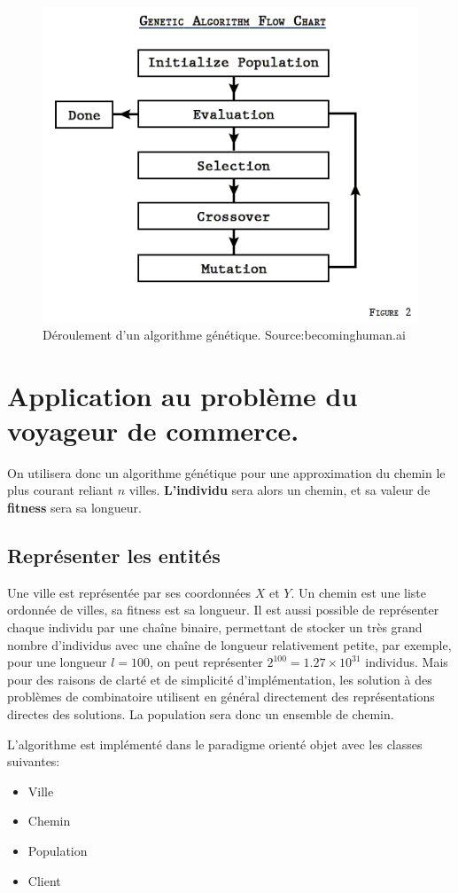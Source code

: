 \documentclass[11pt]{article}
\begin{document}
\begin{figure}[H]
\centering
\includegraphics[width=.6\linewidth]{./GA.png}
\caption{Déroulement d'un algorithme génétique. Source:becominghuman.ai}
\end{figure}

\section{Application au problème du voyageur de commerce.}
\label{sec-2}

On utilisera donc un algorithme génétique pour une approximation du chemin le plus courant reliant $n$ villes.
\textbf{L'individu} sera alors un chemin, et sa valeur de \textbf{fitness} sera sa longueur.   

\subsection{Représenter les entités}
\label{sec-2-1}

Une ville est représentée par ses coordonnées $X$ et $Y$.
Un chemin est une liste ordonnée de villes, sa fitness est sa longueur. Il est aussi possible de représenter chaque individu par une chaîne
binaire, permettant de stocker un très grand nombre d'individus avec une chaîne de longueur relativement petite, par exemple, pour une longueur
$l = 100$, on peut représenter $2^{100} = 1.27 \times 10^{31}$ individus. Mais pour des raisons de clarté et de simplicité d'implémentation,
les solution à des problèmes de combinatoire utilisent en général directement des représentations directes des solutions.
La population sera donc un ensemble de chemin.

L'algorithme est implémenté dans le paradigme orienté objet avec les classes suivantes:
\begin{itemize}
\item Ville
\item Chemin
\item Population
\item Client
\end{itemize}
\end{document}
